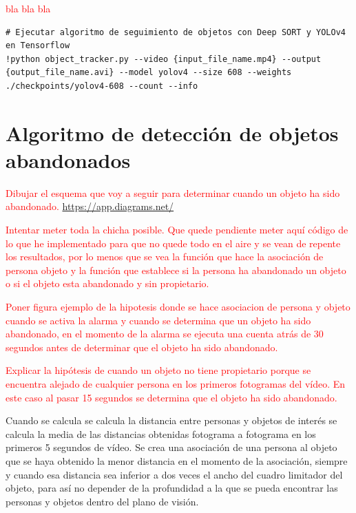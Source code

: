 \textcolor{red}{bla bla bla}

\vspace{0.5cm}
\begin{lstlisting}[language=iPython,caption=Evaluación del seguimiento de objetos Deep SORT y YOLOv4 en Tensorflow (2),captionpos=b,label={lst:evaluate-deepsort-tf2}]
# Ejecutar algoritmo de seguimiento de objetos con Deep SORT y YOLOv4 en Tensorflow
!python object_tracker.py --video {input_file_name.mp4} --output {output_file_name.avi} --model yolov4 --size 608 --weights ./checkpoints/yolov4-608 --count --info
\end{lstlisting}


\newpage

\section{Algoritmo de detección de objetos abandonados}
\label{sec:algoritmo-object-detection}

\textcolor{red}{Dibujar el esquema que voy a seguir para determinar cuando un objeto ha sido abandonado.}
\url{https://app.diagrams.net/}

\textcolor{red}{Intentar meter toda la chicha posible. Que quede pendiente meter aquí código de lo que he implementado para que no quede todo en el aire y se vean de repente los resultados, por lo menos que se vea la función que hace la asociación de persona objeto y la función que establece si la persona ha abandonado un objeto o si el objeto esta abandonado y sin propietario.}

\textcolor{red}{Poner figura ejemplo de la hipotesis donde se hace asociacion de persona y objeto cuando se activa la alarma y cuando se determina que un objeto ha sido abandonado, en el momento de la alarma se ejecuta una cuenta atrás de 30 segundos antes de determinar que el objeto ha sido abandonado.}

\textcolor{red}{Explicar la hipótesis de cuando un objeto no tiene propietario porque se encuentra alejado de cualquier persona en los primeros fotogramas del vídeo. En este caso al pasar 15 segundos se determina que el objeto ha sido abandonado.}

Cuando se calcula se calcula la distancia entre personas y objetos de interés se calcula la media de las distancias obtenidas fotograma a fotograma en los primeros 5 segundos de vídeo. Se crea una asociación de una persona al objeto que se haya obtenido la menor distancia en el momento de la asociación, siempre y cuando esa distancia sea inferior a dos veces el ancho del cuadro limitador del objeto, para así no depender de la profundidad a la que se pueda encontrar las personas y objetos dentro del plano de visión.

